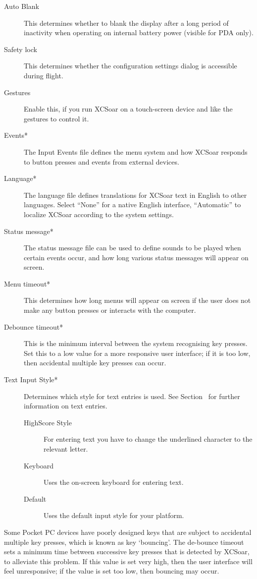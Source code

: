 \begin{description}
\item[Auto Blank] This determines whether to blank the display after a long
period of inactivity when operating on internal battery power (visible for PDA
only).

\item[Safety lock]  This determines whether the configuration settings dialog is
accessible during flight.
\item[Gestures]  Enable this, if you run XCSoar on a touch-screen device and
like the gestures to control it.
\item[Events*]  The Input Events file defines the menu system and how XCSoar
responds to button presses and events from external devices.
\item[Language*]  The language file defines translations for XCSoar text in English to
other languages.  Select ``None'' for a native English interface, ``Automatic''
to localize XCSoar according to the system settings.
\item[Status message*]  The status message file can be used to define sounds to be played when certain
events occur, and how long various status messages will appear on screen.
\item[Menu timeout*]  This determines how long menus will appear on screen if the user
does not make any button presses or interacts with the computer.
\item[Debounce timeout*]  This is the minimum interval between the system recognising key presses. 
Set this to a low value for a more responsive user interface; if
it is too low, then accidental multiple key presses can occur.

\item[Text Input Style*] Determines which style for text entries is used. See Section~ for further information on text entries.
\begin{description}
\item[HighScore Style] For entering text you have to change the underlined character to the relevant letter.
\item[Keyboard] Uses the on-screen keyboard for entering text.
\item[Default] Uses the default input style for your platform.
\end{description}
\end{description}

Some Pocket PC devices have poorly designed keys that are subject to
accidental multiple key presses, which is known as key `bouncing'.  The
de-bounce timeout sets a minimum time between successive key presses
that is detected by XCSoar, to alleviate this problem.  If this value
is set very high, then the user interface will feel unresponsive; if
the value is set too low, then bouncing may occur.

